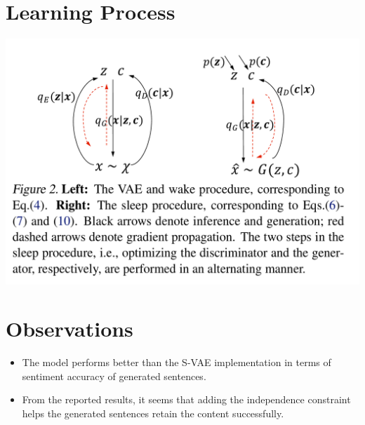 \documentclass[12pt]{article}
\begin{document}
\section{Learning Process}
  \includegraphics[width=\textwidth]{learning-process}

\section{Observations}
  \begin{itemize}
    \item The model performs better than the S-VAE \cite{kingma2014semi} implementation in terms of sentiment accuracy of generated sentences.
    \item From the reported results, it seems that adding the independence constraint helps the generated sentences retain the content successfully.
  \end{itemize}



\end{document}
